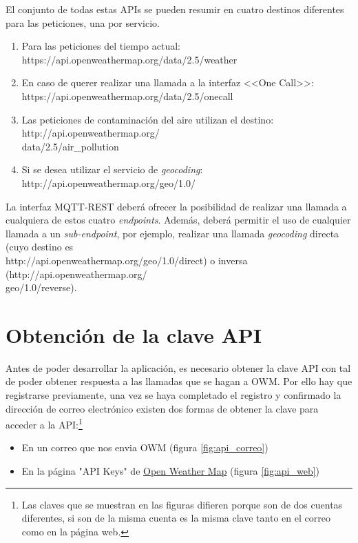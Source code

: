 \documentclass{scrbook}
\begin{document}
El conjunto de todas estas APIs se pueden resumir en cuatro destinos diferentes para las peticiones, una por servicio.
\begin{enumerate}
    \item Para las peticiones del tiempo actual: https://api.openweathermap.org/data/2.5/weather
    \item En caso de querer realizar una llamada a la interfaz <<One Call>>:\\ https://api.openweathermap.org/data/2.5/onecall
    \item Las peticiones de contaminación del aire utilizan el destino: http://api.openweathermap.org/\\data/2.5/air\_pollution
    \item Si se desea utilizar el servicio de \textit{geocoding}: http://api.openweathermap.org/geo/1.0/
\end{enumerate}

La interfaz MQTT-REST deberá ofrecer la posibilidad de realizar una llamada a cualquiera de estos cuatro \textit{endpoints}. Además, deberá permitir el uso de cualquier llamada a un \textit{sub-endpoint}, por ejemplo, realizar una llamada \textit{geocoding} directa (cuyo destino es\\ http://api.openweathermap.org/geo/1.0/direct) o inversa (http://api.openweathermap.org/\\geo/1.0/reverse).

\section{Obtención de la clave API}
Antes de poder desarrollar la aplicación, es necesario obtener la clave API con tal de poder obtener respuesta a las llamadas que se hagan a OWM. Por ello hay que registrarse previamente, una vez se haya completado el registro y confirmado la dirección de correo electrónico existen dos formas de obtener la clave para acceder a la API:\footnote{Las claves que se muestran en las figuras difieren porque son de dos cuentas diferentes, si son de la misma cuenta es la misma clave tanto en el correo como en la página web.}

\begin{itemize}
    \item En un correo que nos envia OWM (figura \ref{fig:api_correo})
    \item En la página "API Keys" de \href{http://openweathermap.org/api_keys}{Open Weather Map} (figura \ref{fig:api_web})
\end{itemize}
\end{document}
